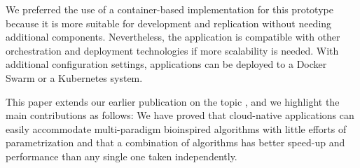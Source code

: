 \documentclass[review]{elsarticle}
\begin{document}
We preferred the use of a container-based implementation for this prototype because
it is more suitable for development and replication without needing
additional components. Nevertheless, the application is compatible with other
orchestration and deployment technologies if more scalability is needed. 
With additional configuration settings, applications can be deployed 
to a Docker Swarm or a Kubernetes system.




This paper extends our earlier publication on the topic
\cite{guervos2018introducing}, and we highlight the main contributions as
follows:
We have proved that cloud-native applications can easily accommodate multi-paradigm bioinspired algorithms
with little efforts of parametrization and
that a combination of algorithms has better speed-up and performance
than any single one taken independently.
\end{document}
